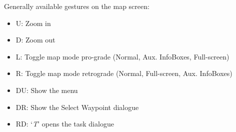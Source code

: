 Generally available gestures on the map screen:
\begin{itemize}
\item U: Zoom in
\item D: Zoom out
\item L: Toggle map mode pro-grade (Normal, Aux. InfoBoxes, Full-screen)
\item R: Toggle map mode retrograde (Normal, Full-screen, Aux. InfoBoxes)
\item DU: Show the menu
\item DR: Show the Select Waypoint dialogue
\item RD: `{\it T}' opens the task dialogue
\end{itemize}

